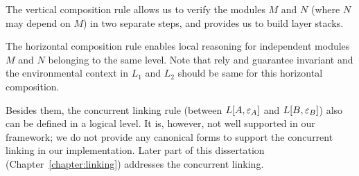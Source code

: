 The vertical composition rule allows us
to verify the modules $M$ and $N$ (where $N$ may depend on $M$) 
in two separate steps, and provides us to build layer stacks.
    \begin{mathpar}
\end{mathpar}

The horizontal composition rule enables local reasoning for independent
modules $M$ and $N$ belonging to the same level. Note that rely and guarantee invariant and the environmental context in $L_1$ and $L_2$ should 
be same for this horizontal composition.
 \begin{mathpar}
\end{mathpar}


Besides them, 
the concurrent linking rule (between $L[A, \oracle_A]$ and $L[B, \oracle_B]$) 
also can be defined in a logical level. 
It is, however, not well supported in our framework; we do not provide
any canonical forms to support the concurrent linking
in our implementation.
Later part of this dissertation (Chapter~\ref{chapter:linking}) addresses the concurrent linking. 



